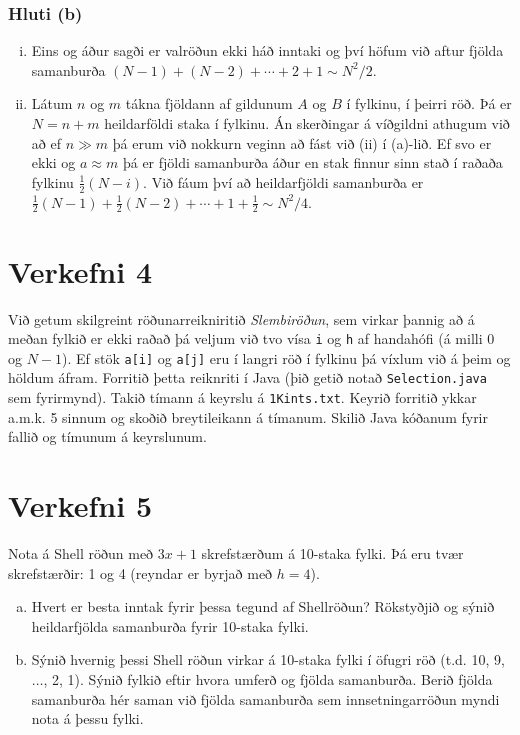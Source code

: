 \documentclass[12pt, a4paper, hidelinks]{article}
\begin{document}
\subsubsection*{Hluti (b)}
    \begin{enumerate}[(i)]
       \item Eins og áður sagði er valröðun ekki háð inntaki og því höfum við aftur fjölda samanburða $(N - 1) + (N - 2) + \cdots + 2 + 1 \sim N^2/2$.
       \item Látum $n$ og $m$ tákna fjöldann af gildunum $A$ og $B$ í fylkinu, í þeirri röð. Þá er $N = n + m$ heildarföldi staka í fylkinu. Án skerðingar á
       víðgildni athugum við að ef $n \gg m$ þá erum við nokkurn veginn að fást við (ii) í (a)-lið. Ef svo er ekki og $a \approx m$ þá er fjöldi samanburða áður
       en stak finnur sinn stað í raðaða fylkinu $\frac 12 (N - i)$. Við fáum því að heildarfjöldi samanburða er $\frac 12 (N - 1) + \frac 12 (N - 2) + \cdots + 1 + \frac 12 \sim N^2/4$.
    \end{enumerate}

\newpage

\section*{Verkefni 4}
Við getum skilgreint röðunarreikniritið \emph{Slembiröðun}, sem virkar þannig að á meðan fylkið
er ekki raðað þá veljum við tvo vísa \texttt{i} og \texttt{h} af handahófi (á milli $0$ og $N - 1$). Ef
stök \texttt{a[i]} og \texttt{a[j]} eru í langri röð í fylkinu þá víxlum við á þeim og höldum áfram. Forritið
þetta reiknriti í Java (þið getið notað \texttt{Selection.java} sem fyrirmynd). Takið tímann á keyrslu á \texttt{1Kints.txt}.
Keyrið forritið ykkar a.m.k. 5 sinnum og skoðið breytileikann á tímanum. Skilið Java kóðanum fyrir fallið og tímunum á keyrslunum.

\newpage

\section*{Verkefni 5}
Nota á Shell röðun með $3x + 1$ skrefstærðum á 10-staka fylki. Þá eru tvær skrefstærðir: 1 og 4 (reyndar er byrjað með $h = 4$).
\begin{enumerate}[(a)]
    \item Hvert er besta inntak fyrir þessa tegund af Shellröðun? Rökstyðjið og sýnið heildarfjölda
    samanburða fyrir 10-staka fylki.
    \item Sýnið hvernig þessi Shell röðun virkar á 10-staka fylki í öfugri röð (t.d. 10, 9, $\ldots$\@ , 2, 1).
    Sýnið fylkið eftir hvora umferð og fjölda samanburða. Berið fjölda samanburða hér saman við fjölda samanburða
    sem innsetningarröðun myndi nota á þessu fylki.
\end{enumerate}
\end{document}
